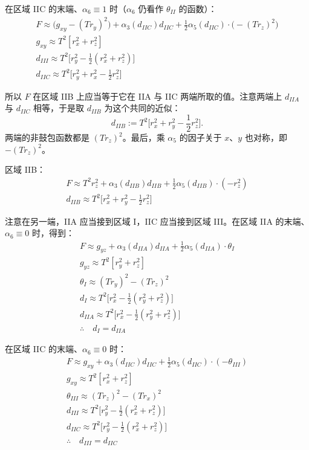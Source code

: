 在区域 IIC 的末端、$\alpha_6\equiv1$ 时（$\alpha_6$ 仍看作 $\theta_{II}$ 的函数）：
\begin{gather*}
F\approx\big(g_{xy}-(Tr_y)^2\big)+\alpha_3(d_{IIC})d_{IIC}+\frac12\alpha_5(d_{IIC})\cdot\big(-(Tr_z)^2\big)\\
g_{xy}\approx T^2[r_x^2+r_z^2]\\
d_{III}\approx T^2\Big[r_y^2-\frac12(r_x^2+r_z^2)\Big]\\
d_{IIC}\approx T^2\Big[r_y^2+r_x^2-\frac12r_z^2\Big]
\end{gather*}

所以 $F$ 在区域 IIB 上应当等于它在 IIA 与 IIC 两端所取的值。注意两端上 $d_{IIA}$ 与 $d_{IIC}$ 相等，于是取 $d_{IIB}$ 为这个共同的近似：
\[
d_{IIB}:=T^2\Big[r_x^2+r_y^2-\frac12r_z^2\Big].
\]
两端的非鼓包函数都是 $(Tr_z)^2$。最后，乘 $\alpha_5$ 的因子关于 $x$、$y$ 也对称，即 $-(Tr_z)^2$。


区域 IIB：
\begin{gather*}
F\approx T^2r_z^2+\alpha_3(d_{IIB})d_{IIB}+\frac12\alpha_5(d_{IIB})\cdot(-r_z^2)\\
d_{IIB}\approx T^2\Big[r_x^2+r_y^2-\frac12r_z^2\Big]
\end{gather*}

注意在另一端，IIA 应当接到区域 I，IIC 应当接到区域 III。在区域 IIA 的末端、$\alpha_6\equiv0$ 时，得到：
\begin{gather*}
F\approx g_{yz}+\alpha_3(d_{IIA})d_{IIA}+\frac12\alpha_5(d_{IIA})\cdot\theta_I\\
g_{yz}\approx T^2[r_y^2+r_z^2]\\
\theta_I\approx(Tr_y)^2-(Tr_z)^2\\
d_I\approx T^2\Big[r_x^2-\frac12(r_y^2+r_z^2)\Big]\\
d_{IIA}\approx T^2\Big[r_x^2-\frac12(r_y^2+r_z^2)\Big]\\
\therefore\quad d_I=d_{IIA}
\end{gather*}

在区域 IIC 的末端、$\alpha_6\equiv0$ 时：
\begin{gather*}
F\approx g_{xy}+\alpha_3(d_{IIC})d_{IIC}+\frac12\alpha_5(d_{IIC})\cdot(-\theta_{III})\\
g_{xy}\approx T^2[r_x^2+r_z^2]\\
\theta_{III}\approx(Tr_z)^2-(Tr_x)^2\\
d_{III}\approx T^2\Big[r_y^2-\frac12(r_x^2+r_z^2)\Big]\\
d_{IIC}\approx T^2\Big[r_y^2-\frac12(r_x^2+r_z^2)\Big]\\
\therefore\quad d_{III}=d_{IIC}
\end{gather*}

